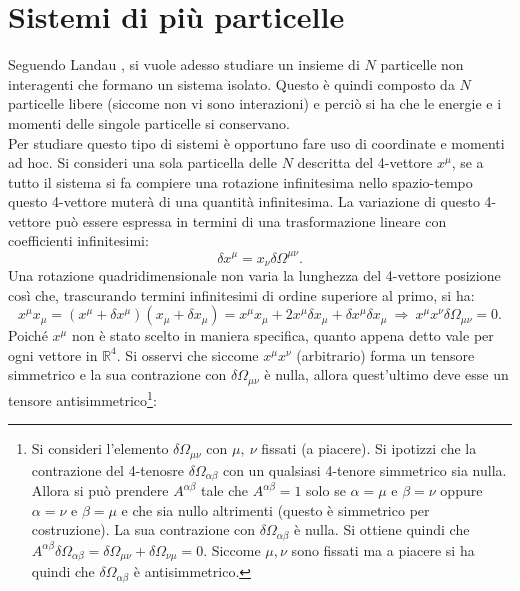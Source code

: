 \section{Sistemi di più particelle}
Seguendo Landau \cite{Landau}, si vuole adesso studiare un insieme di $N$ particelle non interagenti che formano un sistema isolato.
Questo è quindi composto da $N$ particelle libere (siccome non vi sono interazioni) e perciò si ha che le energie e i momenti delle singole particelle si conservano.\\

Per studiare questo tipo di sistemi è opportuno fare uso di coordinate e momenti ad hoc. Si consideri una sola particella delle $N$ descritta del 4-vettore $x^\mu$, se a tutto il sistema si fa compiere una rotazione infinitesima nello spazio-tempo questo 4-vettore muterà di una quantità infinitesima. La variazione di questo 4-vettore può essere espressa in termini di una trasformazione lineare con coefficienti infinitesimi:
\begin{equation*}
    \delta x^\mu=x_\nu\delta \Omega^{\mu\nu}.
\end{equation*}
Una rotazione quadridimensionale non varia la lunghezza del 4-vettore posizione così che, trascurando termini infinitesimi di ordine superiore al primo, si ha: 
\begin{equation*}
    x^\mu x_\mu=(x^\mu+\delta x^\mu)(x_\mu+\delta x_\mu)= x^\mu x_\mu+2x^\mu \delta x_\mu+ \delta x^\mu\delta x_\mu\ \Rightarrow \ x^\mu x^\nu \delta \Omega_{\mu \nu}=0.
\end{equation*}
Poiché $x^\mu$ non è stato scelto in maniera specifica, quanto appena detto vale per ogni vettore in $\mathbb{R}^4$. Si osservi che siccome $x^\mu x^\nu$ (arbitrario) forma un tensore simmetrico e la sua contrazione con $\delta \Omega_{\mu \nu}$ è nulla, allora quest'ultimo deve esse un tensore antisimmetrico\footnote{Si consideri l'elemento $\delta \Omega_{\mu \nu}$ con $\mu,\ \nu$ fissati (a piacere). Si ipotizzi che la contrazione del 4-tenosre $\delta\Omega_{\alpha\beta}$ con un qualsiasi 4-tenore simmetrico sia nulla. Allora si può prendere $A^{\alpha\beta}$ tale che $A^{\alpha\beta}=1$ solo se $\alpha=\mu$ e $\beta=\nu$ oppure $\alpha=\nu$ e $\beta=\mu$ e che sia nullo altrimenti (questo è simmetrico per costruzione). La sua contrazione con $\delta\Omega_{\alpha\beta}$ è nulla. Si ottiene quindi che $A^{\alpha\beta}\delta\Omega_{\alpha\beta}=\delta \Omega_{\mu \nu}+\delta \Omega_{\nu \mu}=0$. Siccome $\mu,\nu$ sono fissati ma a piacere si ha quindi che $\delta\Omega_{\alpha\beta}$ è antisimmetrico.}:
